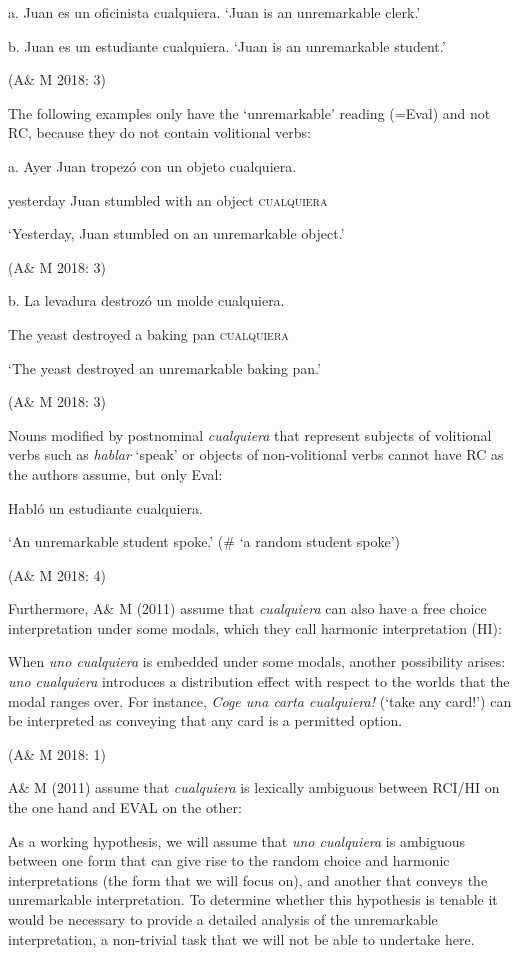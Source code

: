 \documentclass[output=paper]{langscibook}
\begin{document}
  a.  Juan es un oficinista cualquiera. ‘Juan is an unremarkable clerk.’

  b.  Juan es un estudiante cualquiera. ‘Juan is an unremarkable student.’

    (A\& M 2018: 3)

The following examples only have the ‘unremarkable’ reading (=Eval) and not RC, because they do not contain volitional verbs:

  a.  Ayer  Juan  tropezó  con  un  objeto  cualquiera.

    yesterday  Juan  stumbled  with  an  object  \textsc{cualquiera}

    ‘Yesterday, Juan stumbled on an unremarkable object.’ 

    (A\& M 2018: 3)

  b.  La  levadura  destrozó  un  molde  cualquiera.

    The  yeast  destroyed  a  baking pan  \textsc{cualquiera}

    ‘The yeast destroyed an unremarkable baking pan.’

    (A\& M 2018: 3)

Nouns modified by postnominal \textit{cualquiera} that represent subjects of volitional verbs such as \textit{hablar} ‘speak’ or objects of non-volitional verbs cannot have RC as the authors assume, but only Eval:

  Habló un estudiante cualquiera.

  ‘An unremarkable student spoke.’ (\# ‘a random student spoke’)

  (A\& M 2018: 4)

Furthermore, A\& M (2011) assume that \textit{cualquiera} can also have a free choice interpretation under some modals, which they call harmonic interpretation (HI): 

When \textit{uno cualquiera} is embedded under some modals, another possibility arises: \textit{uno cualquiera} introduces a distribution effect with respect to the worlds that the modal ranges over. For instance, \textit{Coge una carta cualquiera!} (‘take any card!’) can be interpreted as conveying that any card is a permitted option. 

(A\& M 2018: 1)

A\& M (2011) assume that \textit{cualquiera} is lexically ambiguous between RCI/HI on the one hand and EVAL on the other:

As a working hypothesis, we will assume that \textit{uno cualquiera} is ambiguous between one form that can give rise to the random choice and harmonic interpretations (the form that we will focus on), and another that conveys the unremarkable interpretation. To determine whether this hypothesis is tenable it would be necessary to provide a detailed analysis of the unremarkable interpretation, a non-trivial task that we will not be able to undertake here.
\end{document}

